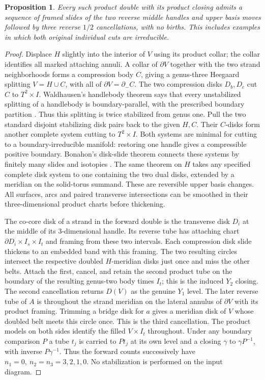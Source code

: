 \documentclass[11pt,letterpaper]{article}
\numberwithin{equation}{section}
\newtheorem{proposition}[theorem]{Proposition}
\theoremstyle{remark}
\begin{document}
\begin{proposition}\label{prop:doubled-free-three}
Every such product double with its product closing admits a sequence
of framed slides of the two reverse middle handles and upper basis
moves followed by three reverse \(1/2\) cancellations, with no births.
This includes examples in which both original individual cuts are
irreducible.
\end{proposition}
\begin{proof}
Displace \(H\) slightly into the interior of \(V\) using its product collar; the collar identifies all marked attaching annuli. A collar of \(\partial V\) together with the two strand neighborhoods
forms a compression body \(C\), giving a genus-three Heegaard splitting
\(V=H\cup C\), with all of \(\partial V=\partial_- C\). The two
compression disks \(D_b,D_c\) cut \(C\) to \(T^2\times I\).
Waldhausen's handlebody theorem says that every unstabilized
splitting of a handlebody is boundary-parallel, with the prescribed
boundary partition \cite[\S1 and \S4(3)]{Waldhausen1968Heegaard}.
Thus this splitting is twice stabilized from genus one. Pull the two
standard disjoint stabilizing disk pairs back to the given \(H,C\).
Their \(C\)-disks form another complete system cutting to \(T^2\times I\).
Both systems are minimal for cutting to a boundary-irreducible
manifold: restoring one handle gives a compressible positive boundary.
Bonahon's disk-slide theorem connects these systems by finitely many
slides and isotopies \cite[Appendix B, Proposition B.1]{Bonahon1983Cobordism}.
The same theorem on \(H\) takes any specified complete disk system
to one containing the two dual disks, extended by a meridian on the
solid-torus summand. These are reversible upper basis changes.
All surfaces, arcs and paired transverse intersections can be smoothed
in their three-dimensional product charts before thickening.

The co-core disk of a strand in the forward double is the transverse
disk \(D_i\) at the middle of its 3-dimensional handle. Its reverse
tube has attaching chart \(\partial D_i\times I_s\times I_t\) and
framing from these two intervals. Each compression disk slide
thickens to an embedded band with this framing. The two resulting
circles intersect the respective doubled \(H\)-meridian disks just
once and miss the other belts. Attach the first, cancel, and retain
the second product tube on the boundary of the resulting genus-two
body times \(I_t\); this is the induced \(Y_2\) closing. The second
cancellation returns \(D(V)\) as the genuine \(Y_1\) level. The later
reverse tube of \(A\) is throughout the strand meridian on the lateral
annulus of \(\partial V\) with its product framing. Trimming a bridge
disk for \(a\) gives a meridian disk of \(V\) whose doubled belt
meets this circle once. This is the third cancellation. The product
models on both sides identify the filled \(V\times I_t\) throughout.
Under any boundary comparison \(P\) a tube \(t_j\) is carried to
\(Pt_j\) at its own level and a closing \(\gamma\) to
\(\gamma P^{-1}\), with inverse \(P\gamma^{-1}\). Thus the forward
counts successively have \(n_1=0,\ n_2=n_3=3,2,1,0\). No
stabilization is performed on the input diagram.
\end{proof}
\end{document}
